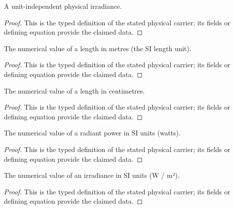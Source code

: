 \begin{definition}
  \label{def:physics:IPhO_2026_2_B_3:aux005}
  A unit-independent physical irradiance.
\end{definition}
\begin{proof}
  This is the typed definition of the stated physical carrier; its fields or defining equation provide the claimed data.
\end{proof}

\begin{definition}
  \label{def:physics:IPhO_2026_2_B_3:aux006}
  The numerical value of a length in metres (the SI length unit).
\end{definition}
\begin{proof}
  This is the typed definition of the stated physical carrier; its fields or defining equation provide the claimed data.
\end{proof}

\begin{definition}
  \label{def:physics:IPhO_2026_2_B_3:aux007}
  The numerical value of a length in centimetres.
\end{definition}
\begin{proof}
  This is the typed definition of the stated physical carrier; its fields or defining equation provide the claimed data.
\end{proof}

\begin{definition}
  \label{def:physics:IPhO_2026_2_B_3:aux008}
  The numerical value of a radiant power in SI units (watts).
\end{definition}
\begin{proof}
  This is the typed definition of the stated physical carrier; its fields or defining equation provide the claimed data.
\end{proof}

\begin{definition}
  \label{def:physics:IPhO_2026_2_B_3:aux009}
  The numerical value of an irradiance in SI units (W / m²).
\end{definition}
\begin{proof}
  This is the typed definition of the stated physical carrier; its fields or defining equation provide the claimed data.
\end{proof}

